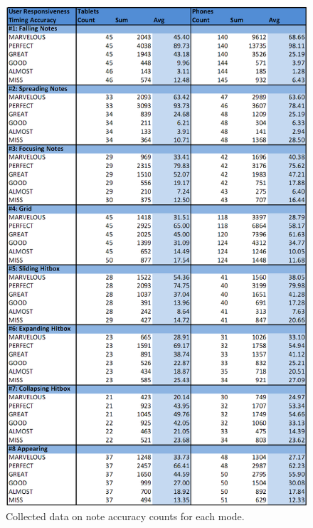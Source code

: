 \documentclass{sig-alternate}
\begin{document}
\begin{figure}[htb!]
	\begin{center}
		\includegraphics[height=1.1\textheight]{figure_data_accuracy}
	\end{center}
	\vspace{-12pt}
	\caption{Collected data on note accuracy counts for each mode.}
	\label{fig:data_accuracy}
\end{figure}
\end{document}
